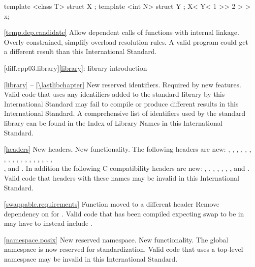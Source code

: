 \begin{codeblock}
template <class T> struct X { };
template <int N> struct Y { };
X< Y< 1 >> 2 > > x;
\end{codeblock}

\ref{temp.dep.candidate}
\change Allow dependent calls of functions with internal linkage.
\rationale Overly constrained, simplify overload resolution rules.
\effect
A valid \CppIII program could get a different result than this
International Standard.

[diff.cpp03.library]{\ref{library}: library introduction}

\ref{library} -- \ref{\lastlibchapter}
\change New reserved identifiers.
\rationale Required by new features.
\effect
Valid \CppIII code that uses any identifiers added to the \Cpp standard
library by this International Standard may fail to compile or produce different
results in this International Standard. A comprehensive list of identifiers used
by the \Cpp standard library can be found in the Index of Library Names in this
International Standard.

\ref{headers}
\change New headers.
\rationale New functionality.
\effect
The following \Cpp headers are new:
,
,
,
,
,
,
,
,
,
,
,
,
,
,
,
,
,
,\\
,
and
.
In addition the following C compatibility headers are new:
,
,
,
,
,
,
,
and
.
Valid \CppIII code that  headers with these names may be
invalid in this International Standard.

\ref{swappable.requirements}
\effect Function  moved to a different header
\rationale Remove dependency on  for .
\effect Valid \CppIII code that has been compiled expecting swap to be in
 may have to instead include .

\ref{namespace.posix}
\change New reserved namespace.
\rationale New functionality.
\effect
The global namespace  is now reserved for standardization. Valid
\CppIII code that uses a top-level namespace  may be invalid in
this International Standard.

